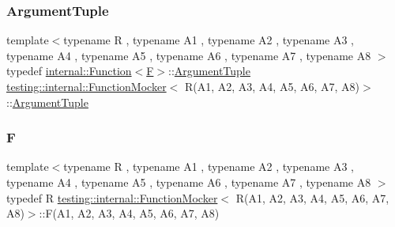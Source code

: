 \subsubsection{\texorpdfstring{Argument\+Tuple}{ArgumentTuple}}
{\footnotesize\ttfamily template$<$typename R , typename A1 , typename A2 , typename A3 , typename A4 , typename A5 , typename A6 , typename A7 , typename A8 $>$ \\
typedef \hyperlink{structtesting_1_1internal_1_1_function}{internal\+::\+Function}$<$\hyperlink{classtesting_1_1internal_1_1_function_mocker_3_01_r_07_a1_00_01_a2_00_01_a3_00_01_a4_00_01_a5_00_01_a6_00_01_a7_00_01_a8_08_4_ad9749c93b0a17540778c5fa162a5fe6c}{F}$>$\+::\hyperlink{classtesting_1_1internal_1_1_function_mocker_3_01_r_07_a1_00_01_a2_00_01_a3_00_01_a4_00_01_a5_00_01_a6_00_01_a7_00_01_a8_08_4_a57bc2be00815deac8964e2d2ae62fdd2}{Argument\+Tuple} \hyperlink{classtesting_1_1internal_1_1_function_mocker}{testing\+::internal\+::\+Function\+Mocker}$<$ R(A1, A2, A3, A4, A5, A6, A7, A8)$>$\+::\hyperlink{classtesting_1_1internal_1_1_function_mocker_3_01_r_07_a1_00_01_a2_00_01_a3_00_01_a4_00_01_a5_00_01_a6_00_01_a7_00_01_a8_08_4_a57bc2be00815deac8964e2d2ae62fdd2}{Argument\+Tuple}}

\mbox{\label{classtesting_1_1internal_1_1_function_mocker_3_01_r_07_a1_00_01_a2_00_01_a3_00_01_a4_00_01_a5_00_01_a6_00_01_a7_00_01_a8_08_4_ad9749c93b0a17540778c5fa162a5fe6c}} 
\subsubsection{\texorpdfstring{F}{F}}
{\footnotesize\ttfamily template$<$typename R , typename A1 , typename A2 , typename A3 , typename A4 , typename A5 , typename A6 , typename A7 , typename A8 $>$ \\
typedef R \hyperlink{classtesting_1_1internal_1_1_function_mocker}{testing\+::internal\+::\+Function\+Mocker}$<$ R(A1, A2, A3, A4, A5, A6, A7, A8)$>$\+::F(A1, A2, A3, A4, A5, A6, A7, A8)}



